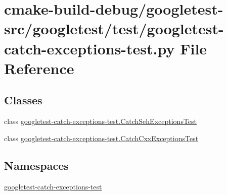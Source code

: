 \hypertarget{googletest-catch-exceptions-test_8py}{}\section{cmake-\/build-\/debug/googletest-\/src/googletest/test/googletest-\/catch-\/exceptions-\/test.py File Reference}
\label{googletest-catch-exceptions-test_8py}
\subsection*{Classes}
\begin{DoxyCompactItemize}
\item 
class \mbox{\hyperlink{classgoogletest-catch-exceptions-test_1_1CatchSehExceptionsTest}{googletest-\/catch-\/exceptions-\/test.\+Catch\+Seh\+Exceptions\+Test}}
\item 
class \mbox{\hyperlink{classgoogletest-catch-exceptions-test_1_1CatchCxxExceptionsTest}{googletest-\/catch-\/exceptions-\/test.\+Catch\+Cxx\+Exceptions\+Test}}
\end{DoxyCompactItemize}
\subsection*{Namespaces}
\begin{DoxyCompactItemize}
\item 
 \mbox{\hyperlink{namespacegoogletest-catch-exceptions-test}{googletest-\/catch-\/exceptions-\/test}}
\end{DoxyCompactItemize}
